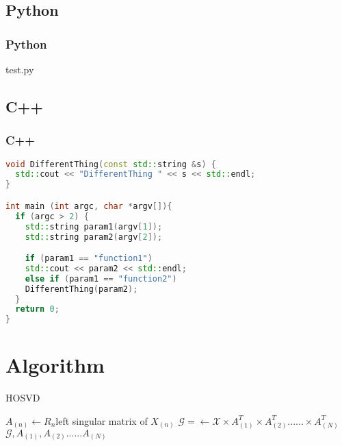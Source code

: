 \subsection{Python}
\begin{frame}
  \frametitle{Python}
  
  {test.py}
\end{frame}

\subsection{C++}
\begin{frame}[fragile]
  \frametitle{C++}
  \begin{lstlisting}[language=c++,frame=single,label=c++,caption={C++ Code}]
void DifferentThing(const std::string &s) {
  std::cout << "DifferentThing " << s << std::endl;
}

int main (int argc, char *argv[]){
  if (argc > 2) {
    std::string param1(argv[1]);
    std::string param2(argv[2]);

    if (param1 == "function1")
    std::cout << param2 << std::endl;
    else if (param1 == "function2")
    DifferentThing(param2);
  }
  return 0;
}
  \end{lstlisting}
\end{frame}

\section{Algorithm}

\begin{frame}
  \begin{algorithm}[H]
    \caption{HOSVD}
    \small

    {
      $A_{(n)}\leftarrow R_{n}$left singular matrix of $X_{(n)}$
    }
    $\mathcal{G}=\leftarrow \mathcal{X} \times A_{(1)}^{T} \times A_{(2)}^{T}...... \times A_{(N)}^{T}$\\
    \Return $\mathcal{G},A_{(1)},A_{(2)}......A_{(N)} $
  \end{algorithm}
\end{frame}